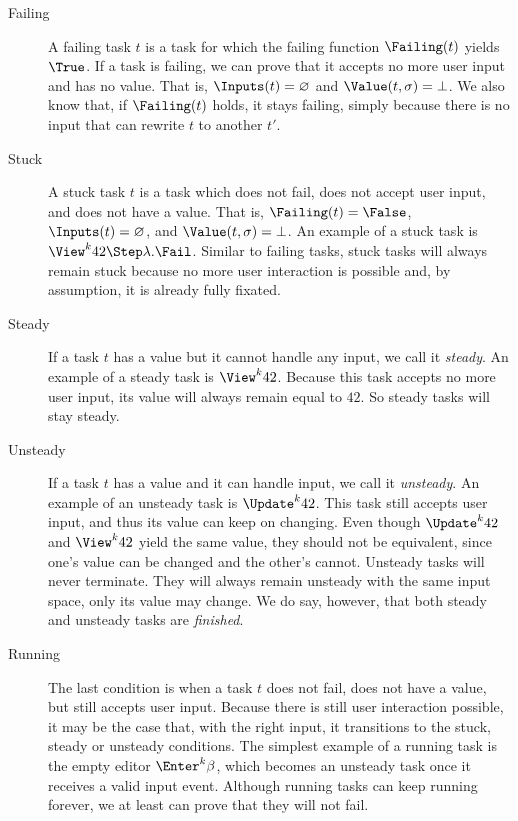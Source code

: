\begin{description}

  \item[Failing]
    A failing task $t$ is a task for which the failing function $\Failing(t)$ yields $\True$.
    If a task is failing, we can prove that it accepts no more user input and has no value.
    That is, $\Inputs(t) = \nothing$ and $\Value(t,\sigma) = \bot$.
    We also know that, if $\Failing(t)$ holds, it stays failing,
    simply because there is no input that can rewrite $t$ to another $t'$.

  \item[Stuck]
    A stuck task $t$ is a task which does not fail, does not accept user input, and does not have a value.
    That is, $\Failing(t) = \False$, $\Inputs(t) = \nothing$, and $\Value(t,\sigma) = \bot$.
    An example of a stuck task is $\View^k 42 \Step \lambda. \Fail$.
    Similar to failing tasks, stuck tasks will always remain stuck because no more user interaction is possible and, by assumption, it is already fully fixated.

  \item[Steady]
    If a task $t$ has a value but it cannot handle any input, we call it \emph{steady}.
    An example of a steady task is $\View^k 42$.
    Because this task accepts no more user input, its value will always remain equal to $42$.
    So steady tasks will stay steady.

  \item[Unsteady]
    If a task $t$ has a value and it can handle input, we call it \emph{unsteady}.
    An example of an unsteady task is $\Update^k 42$.
    This task still accepts user input, and thus its value can keep on changing.
    Even though $\Update^k 42$ and $\View^k 42$ yield the same value,
    they should not be equivalent, since one's value can be changed and the other's cannot.
    Unsteady tasks will never terminate.
    They will always remain unsteady with the same input space, only its value may change.
    We do say, however, that both steady and unsteady tasks are \emph{finished}.

  \item[Running]
    The last condition is when a task $t$ does not fail, does not have a value, but still accepts user input.
    Because there is still user interaction possible, it may be the case that, with the right input,
    it transitions to the stuck, steady or unsteady conditions.
    The simplest example of a running task is the empty editor $\Enter^k \beta$,
    which becomes an unsteady task once it receives a valid input event.
    Although running tasks can keep running forever,
    we at least can prove that they will not fail.

\end{description}

